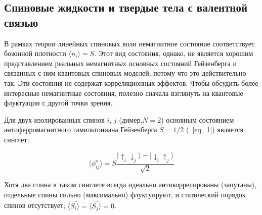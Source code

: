 \documentclass[11pt]{article}
\begin{document}
\subsection{Спиновые жидкости и твердые тела с валентной связью}
В рамках теории линейных спиновых волн немагнитное состояние соответствует бозонной плотности $\langle n_i \rangle = S$. Этот вид состояния, однако, не является хорошим представлением реальных немагнитных основных состояний Гейзенберга и связанных с ним квантовых спиновых моделей, потому что это действительно так. Эти состояния не содержат корреляционных эффектов. Чтобы обсудить более интересные немагнитные состояния, полезно сначала взглянуть на квантовые флуктуации с другой точки зрения.

Для двух изолированных спинов $i$, $j$ (димер,$N = 2$) основным состоянием антиферромагнитного гамильтониана Гейзенберга $S = 1/2$ (~\ref{eq_1}) является синглет;

\begin{equation}
\langle \phi_{ij}^s \rangle = S\frac{|↑_i↓_j\rangle - |↓_i↑_j\rangle}{\sqrt 2}
\label{eq_19}
\end{equation}

Хотя два спина в таком синглете всегда идеально антикоррелированы (запутаны), отдельные спины сильно (максимально) флуктуируют, и статический порядок спинов отсутствует; $\langle \vec{S_i} \rangle = \langle \vec{S_j} \rangle = 0$.
\end{document}
